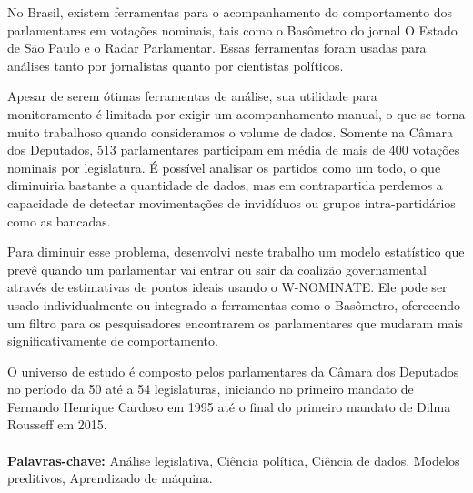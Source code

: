 No Brasil, existem ferramentas para o acompanhamento do comportamento dos
parlamentares em votações nominais, tais como o Basômetro do jornal O Estado de
São Paulo e o Radar Parlamentar. Essas ferramentas foram usadas para análises
tanto por jornalistas quanto por cientistas políticos.

Apesar de serem ótimas ferramentas de análise, sua utilidade para monitoramento
é limitada por exigir um acompanhamento manual, o que se torna muito trabalhoso
quando consideramos o volume de dados. Somente na Câmara dos Deputados, 513
parlamentares participam em média de mais de 400 votações nominais por
legislatura. É possível analisar os partidos como um todo, o que diminuiria
bastante a quantidade de dados, mas em contrapartida perdemos a capacidade de
detectar movimentações de invidíduos ou grupos intra-partidários como as
bancadas.

Para diminuir esse problema, desenvolvi neste trabalho um modelo estatístico
que prevê quando um parlamentar vai entrar ou sair da coalizão governamental
através de estimativas de pontos ideais usando o W-NOMINATE. Ele pode ser usado
individualmente ou integrado a ferramentas como o Basômetro, oferecendo um
filtro para os pesquisadores encontrarem os parlamentares que mudaram mais
significativamente de comportamento.

O universo de estudo é composto pelos parlamentares da Câmara dos Deputados no
período da 50\textordfeminine{} até a 54\textordfeminine{} legislaturas,
iniciando no primeiro mandato de Fernando Henrique Cardoso em 1995 até o final
do primeiro mandato de Dilma Rousseff em 2015.
\\
\\
\textbf{Palavras-chave:} Análise legislativa, Ciência política, Ciência de
dados, Modelos preditivos, Aprendizado de máquina.
